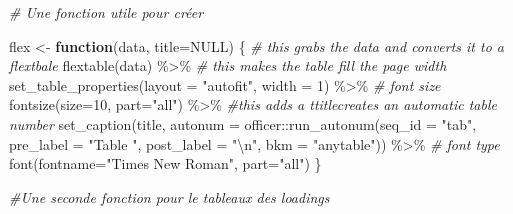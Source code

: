 \documentclass[
]{book}
\newenvironment{Shaded}{\begin{snugshade}}{\end{snugshade}}
\newcommand{\AttributeTok}[1]{\textcolor[rgb]{0.77,0.63,0.00}{#1}}
\newcommand{\CommentTok}[1]{\textcolor[rgb]{0.56,0.35,0.01}{\textit{#1}}}
\newcommand{\ConstantTok}[1]{\textcolor[rgb]{0.00,0.00,0.00}{#1}}
\newcommand{\ControlFlowTok}[1]{\textcolor[rgb]{0.13,0.29,0.53}{\textbf{#1}}}
\newcommand{\DecValTok}[1]{\textcolor[rgb]{0.00,0.00,0.81}{#1}}
\newcommand{\FunctionTok}[1]{\textcolor[rgb]{0.00,0.00,0.00}{#1}}
\newcommand{\NormalTok}[1]{#1}
\newcommand{\OtherTok}[1]{\textcolor[rgb]{0.56,0.35,0.01}{#1}}
\newcommand{\SpecialCharTok}[1]{\textcolor[rgb]{0.00,0.00,0.00}{#1}}
\newcommand{\StringTok}[1]{\textcolor[rgb]{0.31,0.60,0.02}{#1}}
\begin{document}
\begin{Shaded}
\begin{Highlighting}[]
\CommentTok{\# Une fonction utile pour créer }

\NormalTok{flex }\OtherTok{\textless{}{-}} \ControlFlowTok{function}\NormalTok{(data, }\AttributeTok{title=}\ConstantTok{NULL}\NormalTok{) \{}
  \CommentTok{\# this grabs the data and converts it to a flextbale}
  \FunctionTok{flextable}\NormalTok{(data) }\SpecialCharTok{\%\textgreater{}\%}
  \CommentTok{\# this makes the table fill the page width}
  \FunctionTok{set\_table\_properties}\NormalTok{(}\AttributeTok{layout =} \StringTok{"autofit"}\NormalTok{, }\AttributeTok{width =} \DecValTok{1}\NormalTok{) }\SpecialCharTok{\%\textgreater{}\%}
  \CommentTok{\# font size}
  \FunctionTok{fontsize}\NormalTok{(}\AttributeTok{size=}\DecValTok{10}\NormalTok{, }\AttributeTok{part=}\StringTok{"all"}\NormalTok{) }\SpecialCharTok{\%\textgreater{}\%}
    \CommentTok{\#this adds a ttitlecreates an automatic table number}
      \FunctionTok{set\_caption}\NormalTok{(title, }
                  \AttributeTok{autonum =}\NormalTok{ officer}\SpecialCharTok{::}\FunctionTok{run\_autonum}\NormalTok{(}\AttributeTok{seq\_id =} \StringTok{"tab"}\NormalTok{, }
                                                 \AttributeTok{pre\_label =} \StringTok{"Table "}\NormalTok{, }
                                                 \AttributeTok{post\_label =} \StringTok{"}\SpecialCharTok{\textbackslash{}n}\StringTok{"}\NormalTok{, }
                                                 \AttributeTok{bkm =} \StringTok{"anytable"}\NormalTok{)) }\SpecialCharTok{\%\textgreater{}\%}
  \CommentTok{\# font type}
  \FunctionTok{font}\NormalTok{(}\AttributeTok{fontname=}\StringTok{"Times New Roman"}\NormalTok{, }\AttributeTok{part=}\StringTok{"all"}\NormalTok{)}
\NormalTok{\}}

\CommentTok{\#Une seconde fonction pour le tableaux des loadings}


\end{Highlighting}
\end{Shaded}
\end{document}
